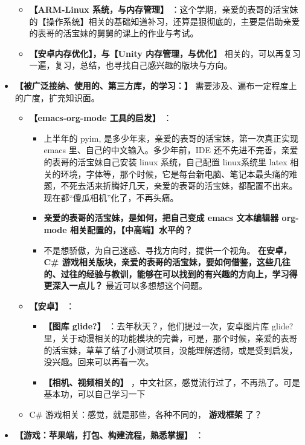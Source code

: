 \documentclass[9pt, b5paper]{article}
\begin{document}
\begin{itemize}
\begin{itemize}
\item \textbf{【ARM-Linux 系统，与内存管理】} ：这个学期，亲爱的表哥的活宝妹的【操作系统】相关的基础知道补习，还算是狠彻底的，主要是借助亲爱的表哥的活宝妹的舅舅的课上的作业与考试。
\item \textbf{【安卓内存优化】，与【Unity 内存管理，与优化】} 相关的，可以再复习一遍，复习，总结，也寻找自己感兴趣的版块与方向。
\end{itemize}
\item \textbf{【被广泛接纳、使用的、第三方库，的学习：】} 需要涉及、遍布一定程度上的广度，扩充知识面。
\begin{itemize}
\item \textbf{【emacs-org-mode 工具的启发】} ：
\begin{itemize}
\item 上半年的 pyim, 是多少年来，亲爱的表哥的活宝妹，第一次真正实现 emacs 里、自己的中文输入。多少年前，IDE 还不先进不完善，亲爱的表哥的活宝妹自己安装 linux 系统，自己配置 linux系统里 latex 相关的环境，字体等，那个时候，它是每台新电脑、笔记本最头痛的难题，不死去活来折腾好几天，亲爱的表哥的活宝妹，都配置不出来。现在都“傻瓜相机”化了，不再头痛。
\item \textbf{亲爱的表哥的活宝妹，是如何，把自己变成 emacs 文本编辑器 org-mode 相关配置的，【中高端】水平的？}
\item 不是想骄傲，为自己迷惑、寻找方向时，提供一个视角。 \textbf{在安卓，C\# 游戏相关版块，亲爱的表哥的活宝妹，要如何借鉴，这些几往的、过往的经验与教训，能够在可以找到的有兴趣的方向上，学习得更深入一点儿？} 最近可以多想想这个问题。
\end{itemize}
\item \textbf{【安卓】} ：
\begin{itemize}
\item \textbf{【图库 glide?】} ：去年秋天？，他们提过一次，安卓图片库 glide? 里，关于动漫相关的功能模块的完善，可是，那个时候，亲爱的表哥的活宝妹，草草了结了小测试项目，没能理解透彻，或是受到启发，没兴趣。回来可以再看一次。
\item \textbf{【相机、视频相关的】} ，中文社区，感觉流行过了，不再热了。可是基本功，可以自己学习一下
\end{itemize}
\item C\# 游戏相关：感觉，就是那些，各种不同的， \textbf{游戏框架} 了？
\end{itemize}
\item \textbf{【游戏：苹果端，打包、构建流程，熟悉掌握】} ：
\begin{itemize}

\end{itemize}
\end{itemize}
\end{document}

